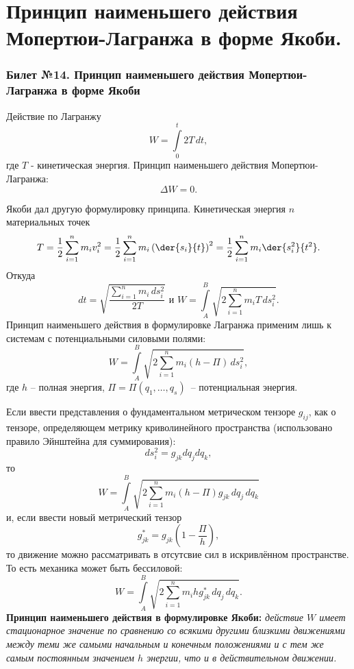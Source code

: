 \chapter{Принцип наименьшего действия Мопертюи-Лагранжа в форме Якоби.}
\subsection{Билет №14. Принцип наименьшего действия Мопертюи-Лагранжа в форме Якоби}

Действие по Лагранжу
\[
    W = \int\limits_{0}^t 2T\,dt,
\]
где \( T \) - кинетическая энергия. Принцип наименьшего действия
Мопертюи-Лагранжа:
\[
    \Delta W = 0.
\]

Якоби дал другую формулировку принципа. Кинетическая энергия \( n \)
материальных точек
\[
    T = \frac{1}{2}\sum\limits_{i=1}^{n} m_i v_i^2 = 
    \frac{1}{2}\sum\limits_{i=1}^{n} m_i \left(\der{s_i}{t}\right)^2 = 
    \frac{1}{2}\sum\limits_{i=1}^{n} m_i \der{s_i^2}{t^2}.
\]
Откуда 
\[
    dt = \sqrt{\frac{\sum\limits_{i=1}^{n} m_i\,ds_i^2}{2T}} \text{ и }
    W = \int\limits_{A}^B \sqrt{{2\sum\limits_{i=1}^{n} m_i T\,ds_i^2}}.
\]
Принцип наименьшего действия в формулировке Лагранжа применим лишь к системам
с потенциальными силовыми полями:
\[
    W = \int\limits_{A}^B \sqrt{{2\sum\limits_{i=1}^{n} m_i {(h-\Pi)}\,ds_i^2}},
\]
где \( h \) -- полная энергия, \( \Pi = \Pi(q_1, \dots, q_s) \)~--
потенциальная энергия.

Если ввести представления о фундаментальном метрическом тензоре \( g_{ij} \),
как о тензоре, определяющем метрику криволинейного пространства 
(использовано правило Эйнштейна для суммирования):
\[
    ds_i^2 = g_{jk}dq_jdq_k,
\]
то 
\[
    W = \int\limits_{A}^B
    \sqrt{{2\sum\limits_{i=1}^{n} m_i (h-\Pi) g_{jk}\,dq_j\,dq_k}}
\]
и, если ввести новый метрический тензор
\[
    g_{jk}^* = g_{jk}\left(1-\frac{\Pi}{h}\right),
\]
то движение можно рассматривать в отсутсвие сил в искривлённом пространстве.
То есть механика может быть бессиловой:
\[
    W = \int\limits_{A}^B
    \sqrt{{2\sum\limits_{i=1}^{n} m_i h g_{jk}^*\,dq_j\,dq_k}}.
\] 
\textbf{Принцип наименьшего действия в формулировке Якоби:}
\emph{действие \( W \) имеет стационарное значение по сравнению со всякими
другими близкими движениями между теми же самыми начальным и
конечным положениями и с тем же самым постоянным значением \( h \) энергии,
что и в действительном движении.}
\newpage
